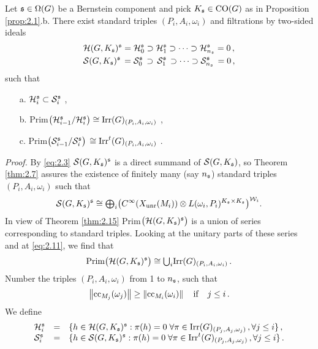 \begin{lem}\label{lem:2.14}
Let $\mathfrak s \in \Omega (G)$ be a Bernstein component and pick $K_{\mathfrak s} \in \mathrm{CO}(G)$ 
as in Proposition \textup{\ref{prop:2.1}.b.} There exist standard triples 
$(P_i ,A_i ,\omega_i )$ and filtrations by two-sided ideals
\begin{align*}
&\mathcal H (G, K_{\mathfrak s})^{\mathfrak s} = \mathcal H^{\mathfrak s}_0 \supset \mathcal H^{\mathfrak s}_1 
\supset \cdots \supset \mathcal H^{\mathfrak s}_{n_{\mathfrak s}} = 0 \,, \\ 
&\mathcal S (G, K_{\mathfrak s})^{\mathfrak s} \, = \mathcal S^{\mathfrak s}_0 \, \supset \, \mathcal S^{\mathfrak s}_1 \,
\supset \cdots \supset \mathcal S^{\mathfrak s}_{n_{\mathfrak s}} \, = 0 \,, 
\end{align*}
such that
\begin{itemize}
\item[a.] $\mathcal H_i^{\mathfrak s} \subset \mathcal S_i^{\mathfrak s}$ ,
\item[b.] Prim$ \big( \mathcal H_{i-1}^{\mathfrak s} / \mathcal H_i^{\mathfrak s} \big) 
\cong \mathrm{Irr}(G)_{(P_i ,A_i ,\omega_i )}$ ,
\item[c.] Prim$ \big( \mathcal S_{i-1}^{\mathfrak s} / \mathcal S_i^{\mathfrak s} \big) \, 
\cong \mathrm{Irr}^t (G)_{(P_i ,A_i ,\omega_i )}$ .
\end{itemize}
\end{lem}
\emph{Proof.}
By \eqref{eq:2.3} $\mathcal S (G, K_{\mathfrak s})^{\mathfrak s}$ is a direct summand of 
$\mathcal S (G, K_{\mathfrak s})$, so Theorem \ref{thm:2.7} assures the existence of finitely many 
(say $n_{\mathfrak s}$) standard triples $(P_i ,A_i ,\omega_i )$ such that
\begin{equation}\label{eq:2.11}
\mathcal S (G,K_{\mathfrak s})^{\mathfrak s} \cong {\textstyle\bigoplus_i} \big( C^\infty (X_{\mathrm{unr}} (M_i )) \otimes 
L(\omega_i ,P_i )^{K_{\mathfrak s} \times K_{\mathfrak s}} \big)^{\mathcal W_i} .
\end{equation}
In view of Theorem \ref{thm:2.15} Prim$ \big( \mathcal H (G, K_{\mathfrak s})^{\mathfrak s} \big)$ is a union 
of series corresponding to standard triples. Looking at the unitary parts of these series 
and at \eqref{eq:2.11}, we find that
\begin{equation}\label{eq:2.18}
\mathrm{Prim} \big( \mathcal H (G, K_{\mathfrak s})^{\mathfrak s} \big) \cong 
{\textstyle\bigcup_i} \mathrm{Irr}(G )_{(P_i ,A_i ,\omega_i )} \,.
\end{equation}
Number the triples $(P_i ,A_i ,\omega_i )$ from 1 to $n_{\mathfrak s}$, such that 
\[
\left\| \mathrm{cc}_{M_j} (\omega_j ) \right\| \geq \left\| \mathrm{cc}_{M_i} (\omega_i ) \right\| \quad \mathrm{if} \quad j \leq i \,. 
\]
We define
\begin{equation}\label{eq:2.22}
\begin{array}{lll}
\mathcal H^{\mathfrak s}_i & = & \{ h \in \mathcal H (G, K_{\mathfrak s})^{\mathfrak s} : \pi (h) = 0 \; \forall \pi \in 
\mathrm{Irr}(G)_{(P_j ,A_j ,\omega_j )} \,, \forall j \leq i \} \,, \\
\mathcal S^{\mathfrak s}_i & = & \{ h \in \mathcal S (G, K_{\mathfrak s})^{\mathfrak s} : \pi (h) = 0 \; \forall \pi \in 
\mathrm{Irr}^t (G)_{(P_j ,A_j ,\omega_j )} \,, \forall j \leq i \} \,.
\end{array}
\end{equation}
